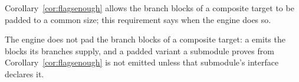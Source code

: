
Corollary~\ref{cor:flagsenough} allows the branch blocks of a composite
target to be padded to a common size; this requirement says when the engine
does so.

\begin{requirement}\label{req:unpadded-branch-blocks}
The engine does not pad the branch blocks of a composite target: a
 emits the blocks its branches supply, and a padded variant a
submodule proves from Corollary~\ref{cor:flagsenough} is not emitted unless
that submodule's interface declares it.
\end{requirement}

